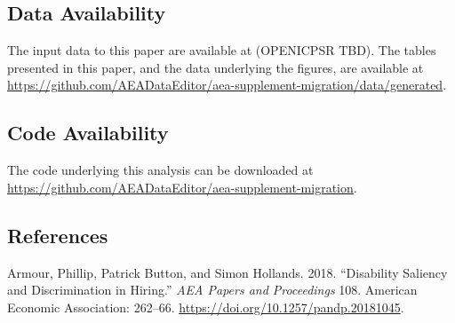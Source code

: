 \documentclass[]{article}
\begin{document}
\hypertarget{data-availability}{%
\subsection{Data Availability}\label{data-availability}}

The input data to this paper are available at (OPENICPSR TBD). The
tables presented in this paper, and the data underlying the figures, are
available at
\url{https://github.com/AEADataEditor/aea-supplement-migration/data/generated}.

\hypertarget{code-availability}{%
\subsection{Code Availability}\label{code-availability}}

The code underlying this analysis can be downloaded at
\url{https://github.com/AEADataEditor/aea-supplement-migration}.

\hypertarget{references}{%
\subsection*{References}\label{references}}

\hypertarget{refs}{}
\leavevmode\hypertarget{ref-Armour_2018}{}%
Armour, Phillip, Patrick Button, and Simon Hollands. 2018. ``Disability
Saliency and Discrimination in Hiring.'' \emph{AEA Papers and
Proceedings} 108. American Economic Association: 262--66.
\url{https://doi.org/10.1257/pandp.20181045}.
\end{document}

